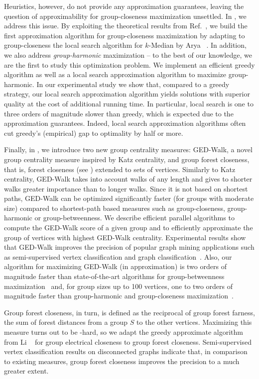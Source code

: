 Heuristics, however, do not provide any approximation guarantees, leaving
the question of approximability for group-closeness maximization unsettled.
In , we address this issue.
By exploiting the theoretical results
from Ref.~\cite{DBLP:conf/alenex/AngrimanBDGGM21}, we build the first
approximation algorithm for group-closeness maximization by adapting to
group-closeness the local search algorithm for $k$-Median by Arya
\etal~\cite{DBLP:journals/siamcomp/AryaGKMMP04}. In
addition, we also address \emph{group-harmonic} maximization -- to
the best of our knowledge, we are the first to study this optimization problem.
We implement an efficient greedy algorithm as well as a local search
approximation algorithm to maximize group-harmonic.
In our experimental study we show that, compared to a greedy strategy, our local
search approximation algorithm yields solutions with superior quality at the cost
of additional running time. In particular, local search is one to three orders
of magnitude slower than greedy, which is expected due to the approximation
guarantees. Indeed, local search approximation algorithms often cut greedy's
(empirical) gap to optimality by half or more.

Finally, in , we introduce two new group centrality
measures: GED-Walk, a novel group centrality
measure inspired by Katz centrality, and group forest closeness, that is, forest
closeness (see ) extended to sets of vertices.
Similarly to Katz centrality, GED-Walk takes into account walks of any length
and gives to shorter walks greater importance than to longer walks. Since it is
not based on shortest paths, GED-Walk can be optimized significantly faster
(for groups with moderate size) compared to shortest-path based measures such
as group-closeness, group-harmonic or group-betweenness.
%
We describe efficient parallel algorithms to
compute the GED-Walk score of a given group and to efficiently approximate the
group of vertices with highest GED-Walk centrality. Experimental results show
that GED-Walk improves the precision of popular graph mining applications
such as semi-supervised vertex classification and graph
classification~\cite{DBLP:journals/tnn/ChapelleSZ09}. Also, our
algorithm for maximizing GED-Walk (in approximation) is two orders of magnitude
faster than state-of-the-art algorithms for group-betweenness
maximization~\cite{DBLP:conf/kdd/MahmoodyTU16} and, for group sizes up to 100
vertices, one to two orders of magnitude faster than group-harmonic and
group-closeness maximization~\cite{DBLP:conf/alenex/BergaminiGM18}.

Group forest closeness, in turn, is defined as the reciprocal of group
forest farness, \ie the sum of forest distances from a group $S$ to the
other vertices. Maximizing this measure turns out to be \np-hard, so we adapt
the greedy approximate algorithm from Li \etal~\cite{DBLP:conf/www/0002PSYZ19}
for group electrical closeness to group forest closeness.
Semi-supervised vertex classification results on disconnected graphs indicate
that, in comparison to existing measures, group forest closeness improves the
precision to a much greater extent.
